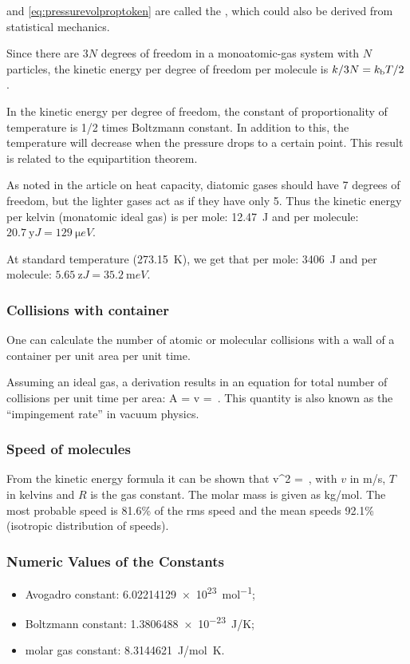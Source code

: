  and \cref{eq:pressurevolproptoken} are called the , which could also be derived from statistical mechanics.

Since there are $3N$ degrees of freedom in a monoatomic-gas system with $N$ particles, the kinetic energy per degree of freedom per molecule is $k/3N = k_\text{b} T/2$.

In the kinetic energy per degree of freedom, the constant of proportionality of temperature is 1/2 times Boltzmann constant. In addition to this, the temperature will decrease when the pressure drops to a certain point. This result is related to the equipartition theorem.

As noted in the article on heat capacity, diatomic gases should have 7 degrees of freedom, but the lighter gases act as if they have only 5. Thus the kinetic energy per kelvin (monatomic ideal gas) is per mole: \SI{12.47}{J} and per molecule: $\SI{20.7}{\yocto J} = \SI{129}{\micro eV}$.

At standard temperature (\SI{273.15}{K}), we get that per mole: \SI{3406}{J} and per molecule: $\SI{5.65}{\zepto J} = \SI{35.2}{\milli eV}$.


\subsubsection{Collisions with container}
One can calculate the number of atomic or molecular collisions with a wall of a container per unit area per unit time.

Assuming an ideal gas, a derivation results in an equation for total number of collisions per unit time per area:
\beq
A = v = \,.
\eeq
This quantity is also known as the ``impingement rate'' in vacuum physics.


\subsubsection{Speed of molecules}
From the kinetic energy formula it can be shown that
\beq
v^2 = \,,
\eeq
with $v$ in \si{m/s}, $T$ in kelvins and $R$ is the gas constant. The molar mass is given as \si{kg/mol}. The most probable speed is 81.6\% of the rms speed and the mean speeds 92.1\% (isotropic distribution of speeds).


\subsubsection{Numeric Values of the Constants}
\begin{itemize}
\item Avogadro constant: \SI{6.022 141 29e23}{mol^{-1}};
\item Boltzmann constant: \SI{1.380 6488e-23}{J/K};
\item molar gas constant: \SI{8.314 4621}{J/mol.K}.
\end{itemize}
